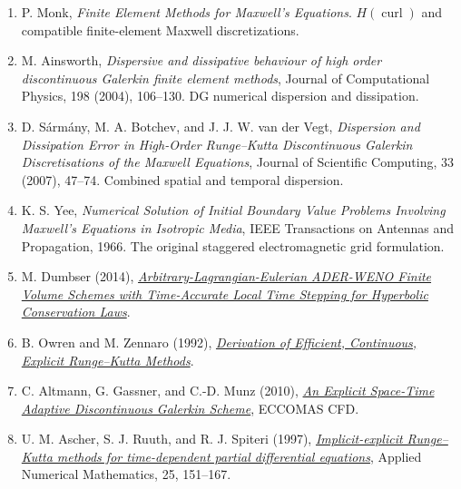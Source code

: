 \documentclass[11pt,openany]{book}
\numberwithin{equation}{chapter}
\theoremstyle{definition}
\theoremstyle{remark}
\newcommand{\curl}{\operatorname{curl}}
\begin{document}
\begin{enumerate}
\item P. Monk, \emph{Finite Element Methods for Maxwell's Equations}. $H(\curl)$ and compatible finite-element Maxwell discretizations.
\item M. Ainsworth, \emph{Dispersive and dissipative behaviour of high order discontinuous Galerkin finite element methods}, Journal of Computational Physics, 198 (2004), 106--130. DG numerical dispersion and dissipation.
\item D. S\'arm\'any, M. A. Botchev, and J. J. W. van der Vegt, \emph{Dispersion and Dissipation Error in High-Order Runge--Kutta Discontinuous Galerkin Discretisations of the Maxwell Equations}, Journal of Scientific Computing, 33 (2007), 47--74. Combined spatial and temporal dispersion.
\item K. S. Yee, \emph{Numerical Solution of Initial Boundary Value Problems Involving Maxwell's Equations in Isotropic Media}, IEEE Transactions on Antennas and Propagation, 1966. The original staggered electromagnetic grid formulation.
\item M. Dumbser (2014), \href{https://doi.org/10.1016/j.cma.2014.07.019}{\emph{Arbitrary-Lagrangian-Eulerian ADER-WENO Finite Volume Schemes with Time-Accurate Local Time Stepping for Hyperbolic Conservation Laws}}.
\item B. Owren and M. Zennaro (1992), \href{https://doi.org/10.1137/0913084}{\emph{Derivation of Efficient, Continuous, Explicit Runge--Kutta Methods}}.
\item C. Altmann, G. Gassner, and C.-D. Munz (2010), \href{https://congress2.cimne.com/eccomas/proceedings/cfd2010/papers/01008.pdf}{\emph{An Explicit Space-Time Adaptive Discontinuous Galerkin Scheme}}, ECCOMAS CFD.
\item U. M. Ascher, S. J. Ruuth, and R. J. Spiteri (1997), \href{https://doi.org/10.1016/S0168-9274(97)00056-1}{\emph{Implicit-explicit Runge--Kutta methods for time-dependent partial differential equations}}, Applied Numerical Mathematics, 25, 151--167.
\end{enumerate}
\end{document}
